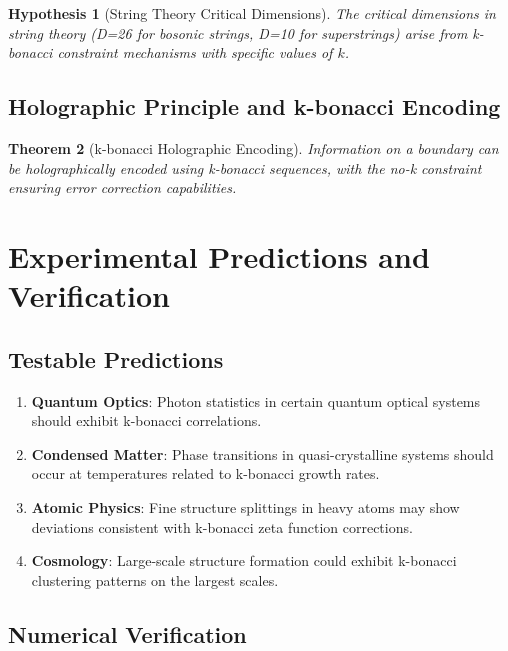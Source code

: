 \documentclass[12pt]{article}
\theoremstyle{plain}
\newtheorem{theorem}{Theorem}[section]
\newtheorem{hypothesis}[theorem]{Hypothesis}
\theoremstyle{definition}
\begin{document}
\begin{hypothesis}[String Theory Critical Dimensions]
The critical dimensions in string theory (D=26 for bosonic strings, D=10 for superstrings) arise from k-bonacci constraint mechanisms with specific values of $k$.
\end{hypothesis}

\subsection{Holographic Principle and k-bonacci Encoding}

\begin{theorem}[k-bonacci Holographic Encoding]
Information on a boundary can be holographically encoded using k-bonacci sequences, with the no-k constraint ensuring error correction capabilities.
\end{theorem}

\section{Experimental Predictions and Verification}

\subsection{Testable Predictions}

\begin{enumerate}
\item \textbf{Quantum Optics}: Photon statistics in certain quantum optical systems should exhibit k-bonacci correlations.

\item \textbf{Condensed Matter}: Phase transitions in quasi-crystalline systems should occur at temperatures related to k-bonacci growth rates.

\item \textbf{Atomic Physics}: Fine structure splittings in heavy atoms may show deviations consistent with k-bonacci zeta function corrections.

\item \textbf{Cosmology}: Large-scale structure formation could exhibit k-bonacci clustering patterns on the largest scales.
\end{enumerate}

\subsection{Numerical Verification}
\end{document}
